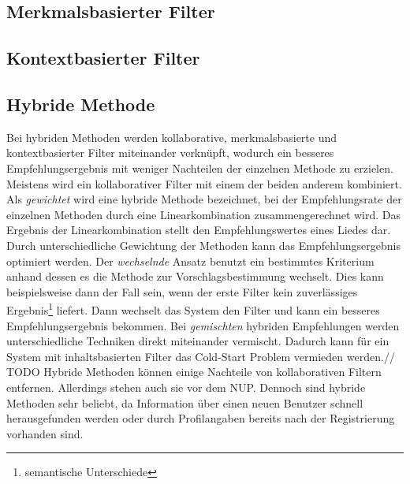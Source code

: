 \documentclass[twosided,a4,10pt]{article}
\begin{document}
\begin{multicols}{2}
		\subsection{Merkmalsbasierter Filter}
		\subsection{Kontextbasierter Filter}

				
		\subsection{Hybride Methode}
		Bei hybriden Methoden werden kollaborative, merkmalsbasierte und kontextbasierter Filter miteinander verknüpft, wodurch ein besseres Empfehlungsergebnis mit weniger Nachteilen der einzelnen Methode zu erzielen. Meistens wird ein kollaborativer Filter mit einem der beiden anderem kombiniert.\newline
		Als \textit{gewichtet} wird eine hybride Methode bezeichnet, bei der Empfehlungsrate der einzelnen Methoden durch eine Linearkombination zusammengerechnet wird. Das Ergebnis der Linearkombination stellt den Empfehlungswertes eines Liedes dar. Durch unterschiedliche Gewichtung der Methoden kann das Empfehlungsergebnis optimiert werden. Der \textit{wechselnde} Ansatz benutzt ein bestimmtes Kriterium anhand dessen es die Methode zur Vorschlagsbestimmung wechselt. Dies kann beispielsweise dann der Fall sein, wenn der erste Filter kein zuverlässiges Ergebnis\footnote[4]{semantische Unterschiede} liefert. Dann wechselt das System den Filter und kann ein besseres Empfehlungsergebnis bekommen. Bei \textit{gemischten} hybriden Empfehlungen werden unterschiedliche Techniken direkt miteinander vermischt. Dadurch kann für ein System mit inhaltsbasierten Filter das Cold-Start Problem vermieden werden.\newline // TODO
		Hybride Methoden können einige Nachteile von kollaborativen Filtern entfernen. Allerdings stehen auch sie vor dem NUP. Dennoch sind hybride Methoden sehr beliebt, da Information über einen neuen Benutzer schnell herausgefunden werden oder durch Profilangaben bereits nach der Registrierung vorhanden sind. \cite{burke}
		

\end{multicols}
\end{document}
